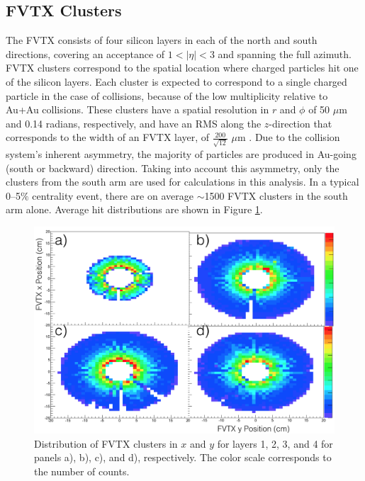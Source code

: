 
\subsection{FVTX Clusters}
The FVTX consists of four silicon layers in each of the north and south directions, covering an acceptance of $1 < | \eta | < 3$ and spanning the full azimuth. FVTX clusters correspond to the spatial location where charged particles hit one of the silicon layers. Each cluster is expected to correspond to a single charged particle in the case of \pau collisions, because of the low multiplicity relative to Au+Au collisions. These clusters have a spatial resolution in $r$ and $\phi$ of 50 $\mu$m and 0.14 radians, respectively, and have an RMS along the $z$-direction that corresponds to the width of an FVTX layer, of $\frac{200}{\sqrt{12}}$ $\mu$m \cite{Aidala201444}. Due to the \pau collision system's inherent asymmetry, the majority of particles are produced in Au-going (south or backward) direction. Taking into account this asymmetry, only the clusters from the south arm are used for calculations in this analysis. In a typical 0--5$\%$ centrality event, there are on average $\sim$1500 FVTX clusters in the south arm alone. Average hit distributions are shown in Figure \ref{fig:fvtx_clusxy}.

\begin{figure}[!ht]
\centering
\includegraphics[width=0.55\linewidth]{figs/fvtx_clus_xy.png}
\caption{Distribution of FVTX clusters in $x$ and $y$ for layers 1, 2, 3, and 4 for panels a), b), c), and d), respectively. The color scale corresponds to the number of counts.}
\label{fig:fvtx_clusxy}
\end{figure}

